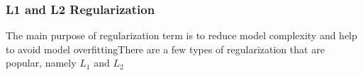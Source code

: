 \subsubsection{L1 and L2 Regularization}

The main purpose of regularization term is to reduce model complexity and help to avoid model overfittingThere are a few types of regularization that are popular, namely $L_1$ and $L_2$